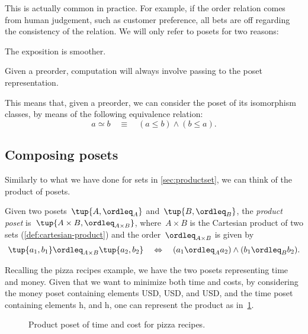 This is actually common in practice. For example, if the order relation comes from human judgement, such as customer preference, all bets are off regarding the consistency of the relation. We will only refer to posets for two reasons:
\begin{compactenum}
        \item The exposition is smoother.
        \item Given a preorder, computation will always involve passing to the poset representation.
\end{compactenum}
This means that, given a preorder, we can consider the poset of its isomorphism classes, by means of the following equivalence relation:
\begin{equation}
        a \simeq b \quad \equiv \quad (a \leq b) \wedge (b \leq a).
\end{equation}

\subsection{Composing posets}
Similarly to what we have done for sets in \cref{sec:productset}, we can think of the product of posets.

\begin{definition}
\label{def:productposet}
Given two posets~$\tup{A, \ordleq_A}$
and~$\tup{B, \ordleq_B}$, the \emph{product poset} is~$\tup{A \times B, \ordleq_{A\times B}}$, where~$A \times B$ is the Cartesian product of two sets (\cref{def:cartesian-product}) and the order~$\ordleq_{A\times B}$ is given by
\begin{equation}
        \tup{a_1, b_1}
        \ordleq_{A\times B}
        \tup{a_2, b_2}
        \quad
        \Leftrightarrow
        \quad
        (a_1 \ordleq_A a_2) \wedge
        (b_1 \ordleq_B b_2).
    \end{equation}
\end{definition}
Recalling the pizza recipes example, we have the two posets representing time and money. Given that we want to minimize both time and costs, by considering the money poset containing elements \unit[1]{USD}, \unit[2]{USD}, and \unit[3]{USD}, and the time poset containing elements \unit[1]{h}, and \unit[2]{h}, one can represent the product as in~\cref{fig:productpizza}.

\begin{figure}[h!]
\begin{center}
\end{center}
\caption{Product poset of time and cost for pizza recipes.\label{fig:productpizza}}
\end{figure}


